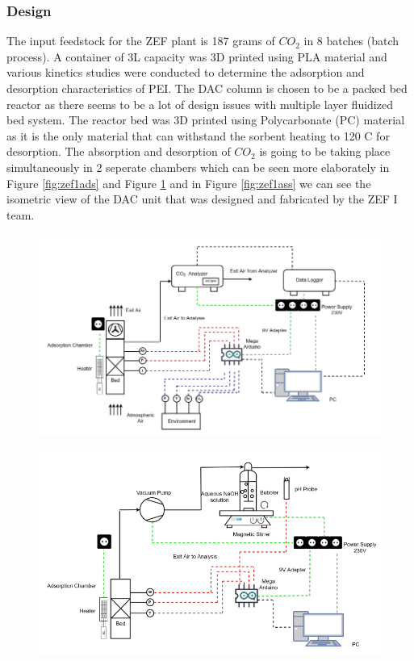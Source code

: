 \subsubsection{Design}
The input feedstock for the ZEF plant is 187 grams of $CO_2$ in 8 batches (batch process). A container of 3L capacity was 3D printed using PLA material and various kinetics studies were conducted to determine the adsorption and desorption characteristics of PEI. The DAC column is chosen to be a packed bed reactor as there seems to be a lot of design issues with multiple layer fluidized bed system. The reactor bed was 3D printed using Polycarbonate (PC) material as it is the only material that can withstand the sorbent heating to 120 \degree C for desorption. The absorption and desorption of $CO_2$ is going to be taking place simultaneously in 2 seperate chambers which can be seen more elaborately in Figure \ref{fig:zef1ads} and Figure \ref{fig:zef1des} and in Figure \ref{fig:zef1ass} we can see the isometric view of the DAC unit that was designed and fabricated by the ZEF I team. 

\begin{figure}[H]
\centering
\begin{minipage}{.5\textwidth}
  \centering
  \includegraphics[width=\linewidth]{images/previouswork/zef1ads.png}
  \label{fig:zef1ads}
\end{minipage}%
\begin{minipage}{.5\textwidth}
  \centering
  \includegraphics[width=\linewidth]{images/previouswork/zef1des.png}
  \label{fig:zef1des}
\end{minipage}
\end{figure}

